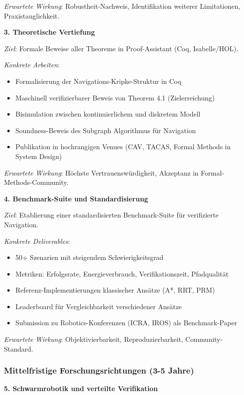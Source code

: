 ﻿\documentclass[a4paper,12pt]{article}
\theoremstyle{definition}
\begin{document}
\textit{Erwartete Wirkung}: Robustheit-Nachweis, Identifikation weiterer Limitationen, Praxistauglichkeit.

\textbf{3. Theoretische Vertiefung}

\textit{Ziel}: Formale Beweise aller Theoreme in Proof-Assistant (Coq, Isabelle/HOL).

\textit{Konkrete Arbeiten}:
\begin{itemize}
	\item Formalisierung der Navigations-Kripke-Struktur in Coq
	\item Maschinell verifizierbarer Beweis von Theorem 4.1 (Zielerreichung)
	\item Bisimulation zwischen kontinuierlichem und diskretem Modell
	\item Soundness-Beweis des Subgraph Algorithmus für Navigation
	\item Publikation in hochrangigen Venues (CAV, TACAS, Formal Methods in System Design)
\end{itemize}

\textit{Erwartete Wirkung}: Höchste Vertrauenswürdigkeit, Akzeptanz in Formal-Methods-Community.

\textbf{4. Benchmark-Suite und Standardisierung}

\textit{Ziel}: Etablierung einer standardisierten Benchmark-Suite für verifizierte Navigation.

\textit{Konkrete Deliverables}:
\begin{itemize}
	\item 50+ Szenarien mit steigendem Schwierigkeitsgrad
	\item Metriken: Erfolgsrate, Energieverbrauch, Verifikationszeit, Pfadqualität
	\item Referenz-Implementierungen klassischer Ansätze (A*, RRT, PRM)
	\item Leaderboard für Vergleichbarkeit verschiedener Ansätze
	\item Submission zu Robotics-Konferenzen (ICRA, IROS) als Benchmark-Paper
\end{itemize}

\textit{Erwartete Wirkung}: Objektivierbarkeit, Reproduzierbarkeit, Community-Standard.

\subsubsection{Mittelfristige Forschungsrichtungen (3-5 Jahre)}

\textbf{5. Schwarmrobotik und verteilte Verifikation}
\end{document}
